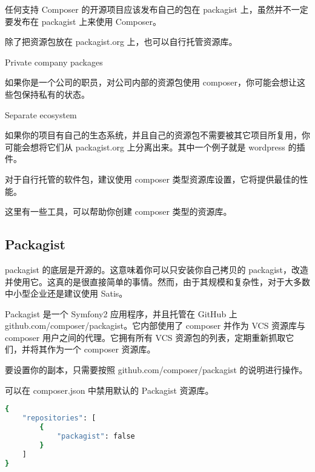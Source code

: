 任何支持 Composer 的开源项目应该发布自己的包在 packagist 上，虽然并不一定要发布在 packagist 上来使用 Composer。

除了把资源包放在 packagist.org 上，也可以自行托管资源库。

\begin{compactitem}
\item Private company packages

如果你是一个公司的职员，对公司内部的资源包使用 composer，你可能会想让这些包保持私有的状态。

\item Separate ecosystem

如果你的项目有自己的生态系统，并且自己的资源包不需要被其它项目所复用，你可能会想将它们从 packagist.org 上分离出来。其中一个例子就是 wordpress 的插件。
\end{compactitem}


对于自行托管的软件包，建议使用 composer 类型资源库设置，它将提供最佳的性能。

这里有一些工具，可以帮助你创建 composer 类型的资源库。

\subsection{Packagist}

packagist 的底层是开源的。这意味着你可以只安装你自己拷贝的 packagist，改造并使用它。这真的是很直接简单的事情。然而，由于其规模和复杂性，对于大多数中小型企业还是建议使用 Satis。

Packagist 是一个 Symfony2 应用程序，并且托管在 GitHub 上 github.com/composer/packagist。它内部使用了 composer 并作为 VCS 资源库与 composer 用户之间的代理。它拥有所有 VCS 资源包的列表，定期重新抓取它们，并将其作为一个 composer 资源库。

要设置你的副本，只需要按照 github.com/composer/packagist 的说明进行操作。

可以在 composer.json 中禁用默认的 Packagist 资源库。

\begin{lstlisting}[language=bash]
{
    "repositories": [
        {
            "packagist": false
        }
    ]
}
\end{lstlisting}






\begin{lstlisting}[language=bash]

\end{lstlisting}

